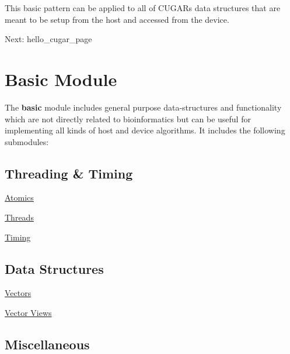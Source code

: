 \begin{DoxyParagraph}{}
This basic pattern can be applied to all of C\+U\+G\+AR\textquotesingle{}s data structures that are meant to be setup from the host and accessed from the device.
\end{DoxyParagraph}
Next\+: hello\+\_\+cugar\+\_\+page \hypertarget{basic_page}{}\section{Basic Module}\label{basic_page}


The {\bfseries basic} module includes general purpose data-\/structures and functionality which are not directly related to bioinformatics but can be useful for implementing all kinds of host and device algorithms. It includes the following submodules\+:\hypertarget{basic_page_ThreadingAndTiming}{}\subsection{Threading \& Timing}\label{basic_page_ThreadingAndTiming}

\begin{DoxyItemize}
\item \hyperlink{atomics_page}{Atomics}
\item \hyperlink{threads_page}{Threads}
\item \hyperlink{timing_page}{Timing} 
\end{DoxyItemize}\hypertarget{basic_page_DataStructures}{}\subsection{Data Structures}\label{basic_page_DataStructures}

\begin{DoxyItemize}
\item \hyperlink{vectors_page}{Vectors}
\item \hyperlink{vector_views_page}{Vector Views} 
\end{DoxyItemize}\hypertarget{basic_page_Miscellaneous}{}\subsection{Miscellaneous}\label{basic_page_Miscellaneous}

